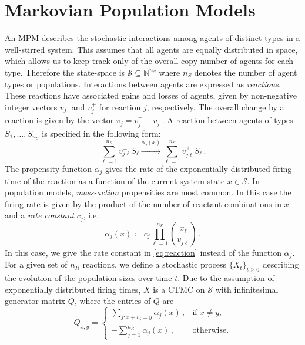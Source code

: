 \section{Markovian Population Models}
An \acf{MPM}
describes the stochastic interactions
among agents of distinct types in a well-stirred system.
This assumes that all agents are equally distributed in space, which
allows us to keep track only of the overall copy number of agents for each type.
Therefore the state-space is $\mathcal{S}\subseteq\mathbb{N}^{n_S}$ where
$n_S$ denotes the number of agent types or populations.
Interactions between agents are expressed as \emph{reactions}.
These reactions have associated
gains and losses of agents, given by non-negative integer vectors   
${v}_j^{-}$ and ${v}_j^{+}$ for reaction $j$, respectively. The overall change by a reaction is given by the vector $v_j = v_j^+ - v_j^-$.
A reaction between agents of types $S_1,\dots, S_{n_S}$ is specified in the following form:
\begin{equation}\label{eq:reaction}
    \sum_{\ell=1}^{n_S} v_{j\ell}^{-} S_\ell
    \xrightarrow{\alpha_j( x)}
    \sum_{\ell=1}^{n_S} v_{j\ell}^{+} S_\ell\,.
\end{equation}
The propensity function $\alpha_j$ gives the rate of the exponentially distributed firing
time of the reaction as a function of the current system state $x\in \mathcal{S}$.
In population models, \emph{mass-action} propensities are most common.
In this case the firing rate is given by the product of the number
of reactant combinations in $x$ and a
\emph{rate constant} $c_j$, i.e.
\begin{equation}\label{eq:stoch_mass_action}
    \alpha_j({x})\coloneqq c_j\prod_{\ell=1}^{n_S}\binom{x_\ell}{v_{j\ell}^{-}}\,.
\end{equation}
In this case, we give the rate constant in \eqref{eq:reaction} instead of the function $\alpha_j$.
For a given set of $n_R$ reactions, we define a stochastic
process $\{{{X}}_t\}_{t\geq 0}$ describing the evolution of the population
sizes over time $t$.
Due to the assumption of exponentially distributed firing times,  $ X$ is
a \ac{CTMC} on $\mathcal{S}$ with infinitesimal  generator matrix $Q$, where
the entries of $Q$ are
\begin{equation}\label{eq:cme_generator}
    Q_{ x,  y} = \begin{cases}
        \sum_{j: x+ v_j = y}\alpha_j( x)\,,&\text{if}\; x\neq
         y,\\[1ex]
        -\sum_{j=1}^{n_R} \alpha_j( x)\,, &\text{otherwise.}
    \end{cases}
\end{equation}
